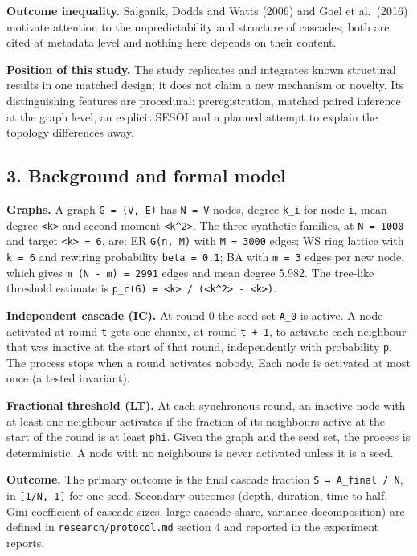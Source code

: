 \documentclass[
]{article}
\begin{document}
\textbf{Outcome inequality.} Salganik, Dodds and Watts (2006) and Goel
et al.~(2016) motivate attention to the unpredictability and structure
of cascades; both are cited at metadata level and nothing here depends
on their content.

\textbf{Position of this study.} The study replicates and integrates
known structural results in one matched design; it does not claim a new
mechanism or novelty. Its distinguishing features are procedural:
preregistration, matched paired inference at the graph level, an
explicit SESOI and a planned attempt to explain the topology differences
away.

\subsection{3. Background and formal
model}\label{background-and-formal-model}

\textbf{Graphs.} A graph \texttt{G\ =\ (V,\ E)} has
\texttt{N\ =\ \textbar{}V\textbar{}} nodes, degree \texttt{k\_i} for
node \texttt{i}, mean degree \texttt{\textless{}k\textgreater{}} and
second moment \texttt{\textless{}k\^{}2\textgreater{}}. The three
synthetic families, at \texttt{N\ =\ 1000} and target
\texttt{\textless{}k\textgreater{}\ =\ 6}, are: ER \texttt{G(n,\ M)}
with \texttt{M\ =\ 3000} edges; WS ring lattice with \texttt{k\ =\ 6}
and rewiring probability \texttt{beta\ =\ 0.1}; BA with \texttt{m\ =\ 3}
edges per new node, which gives \texttt{m\ (N\ -\ m)\ =\ 2991} edges and
mean degree 5.982. The tree-like threshold estimate is
\texttt{p\_c(G)\ =\ \textless{}k\textgreater{}\ /\ (\textless{}k\^{}2\textgreater{}\ -\ \textless{}k\textgreater{})}.

\textbf{Independent cascade (IC).} At round 0 the seed set \texttt{A\_0}
is active. A node activated at round \texttt{t} gets one chance, at
round \texttt{t\ +\ 1}, to activate each neighbour that was inactive at
the start of that round, independently with probability \texttt{p}. The
process stops when a round activates nobody. Each node is activated at
most once (a tested invariant).

\textbf{Fractional threshold (LT).} At each synchronous round, an
inactive node with at least one neighbour activates if the fraction of
its neighbours active at the start of the round is at least
\texttt{phi}. Given the graph and the seed set, the process is
deterministic. A node with no neighbours is never activated unless it is
a seed.

\textbf{Outcome.} The primary outcome is the final cascade fraction
\texttt{S\ =\ \textbar{}A\_final\textbar{}\ /\ N}, in
\texttt{{[}1/N,\ 1{]}} for one seed. Secondary outcomes (depth,
duration, time to half, Gini coefficient of cascade sizes, large-cascade
share, variance decomposition) are defined in
\texttt{research/protocol.md} section 4 and reported in the experiment
reports.
\end{document}
